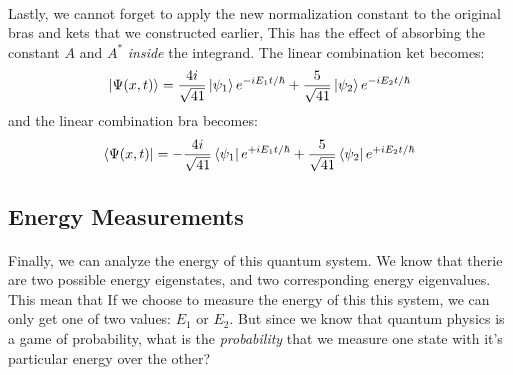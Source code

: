 \documentclass[12pt,letterpaper]{book}
\begin{document}
\paragraph*{}Lastly, we cannot forget to apply the new normalization constant to the original bras and kets that we constructed earlier, This has the effect of absorbing the constant $A$ and $A^*$ \textit{inside} the integrand. The linear combination ket becomes:
\begin{equation}
\label{ex1 norm ket}
\ket{\Psi(x,t)} =  \frac{4i}{\sqrt{41}} \ket{\psi_1}e^{-iE_1t/\hbar} + \frac{5}{\sqrt{41}} \ket{\psi_2} e^{-iE_2t/\hbar}
\end{equation}
and the linear combination bra becomes:
\begin{equation}
\label{ex1 norm bra}
\bra{\Psi(x,t)} =  -\frac{4i}{\sqrt{41}} \bra{\psi_1}e^{+iE_1t/\hbar} + \frac{5}{\sqrt{41}} \bra{\psi_2} e^{+iE_2t/\hbar}
\end{equation}


\subsection*{Energy Measurements}
\paragraph*{}Finally, we can analyze the energy of this quantum system. We know that therie are two possible energy eigenstates, and two corresponding energy eigenvalues. This mean that If we choose to measure the energy of this this system, we can only get one of two values: $E_1$ or $E_2$. But since we know that quantum physics is a game of probability, what is the \textit{probability} that we measure one state with it's particular energy over the other?
\end{document}
